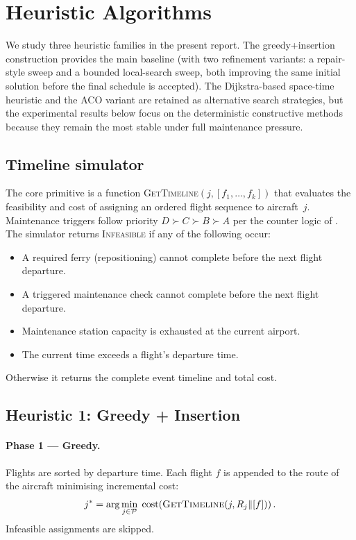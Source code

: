 \section{Heuristic Algorithms}
\label{sec:heuristics}

We study three heuristic families in the present report.  The greedy+insertion
construction provides the main baseline (with two refinement variants: a
repair-style sweep and a bounded local-search sweep, both improving the same
initial solution before the final schedule is accepted).  The Dijkstra-based space-time
heuristic and the ACO variant are retained as alternative search strategies,
but the experimental results below focus on the deterministic constructive
methods because they remain the most stable under full maintenance pressure.

\subsection{Timeline simulator}

The core primitive is a function \textsc{GetTimeline}$(j, [f_1,\ldots,f_k])$
that evaluates the feasibility and cost of assigning an ordered flight sequence
to aircraft~$j$.  Maintenance triggers follow priority $D \succ C \succ B
\succ A$ per the counter logic of .  The simulator returns
\textsc{Infeasible} if any of the following occur:
\begin{itemize}
  \item A required ferry (repositioning) cannot complete before the next flight
    departure.
  \item A triggered maintenance check cannot complete before the next flight
    departure.
  \item Maintenance station capacity is exhausted at the current airport.
  \item The current time exceeds a flight's departure time.
\end{itemize}
Otherwise it returns the complete event timeline and total cost.

\subsection{Heuristic 1: Greedy + Insertion}

\paragraph{Phase 1 — Greedy.}
Flights are sorted by departure time.  Each flight $f$ is appended to the
route of the aircraft minimising incremental cost:
\begin{equation}
  j^* = \arg\min_{j \in \mathcal{P}}\;
  \mathrm{cost}\!\left(\textsc{GetTimeline}(j, R_j \Vert [f])\right).
\end{equation}
Infeasible assignments are skipped.

